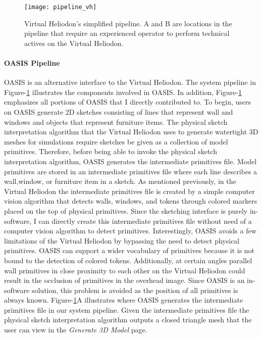 \begin{figure}[h]
\centering
\texttt{[image: pipeline\_vh]}
\caption{Virtual Heliodon's simplified pipeline. A and B are locations in the pipeline that require an experienced operator to perform technical actives on the Virtual Heliodon. }
\label{fig:new_pipeline}
\end{figure}

\paragraph{OASIS Pipeline}
OASIS is an alternative interface to the Virtual Heliodon. 
The system pipeline in Figure-\ref{fig:new_pipeline} illustrates the components involved in OASIS.
In addition, Figure-\ref{fig:new_pipeline} emphasizes all portions of OASIS that I directly contributed to.
To begin, users on OASIS generate 2D sketches consisting of lines that represent wall and windows and objects that represent furniture items.
The physical sketch interpretation algorithm that the Virtual Heliodon uses to generate watertight 3D meshes for simulations require sketches be given as a collection of model primitives. 
Therefore, before being able to invoke the physical sketch interpretation algorithm, OASIS generates the intermediate primitives file.
Model primitives are stored in an intermediate primitives file where each line describes a wall,window, or furniture item in a sketch.
As mentioned previously, in the Virtual Heliodon the intermediate primitives file is created by a simple computer vision algorithm that detects walls, windows, and tokens through colored markers placed on the top of physical primitives.
Since the sketching interface is purely in-software, I can directly create this intermediate primitives file without need of a computer vision algorithm to detect primitives.
Interestingly, OASIS avoids a few limitations of the Virtual Heliodon by bypassing the need to detect physical primitives. 
OASIS can support a wider vocabulary of primitives because it is not bound to the detection of colored tokens.
Additionally, at certain angles parallel wall primitives in close proximity to each other on the Virtual Heliodon could result in the occlusion of primitives in the overhead image. 
Since OASIS is an in-software solution, this problem is avoided as the position of all primitives is always known.
Figure-\ref{fig:new_pipeline}A illustrates where OASIS generates the intermediate primitives file in our system pipeline.
Given the intermediate primitives file the physical sketch interpretation algorithm outputs a closed triangle mesh that the user can view in the \textit{Generate 3D Model} page.
